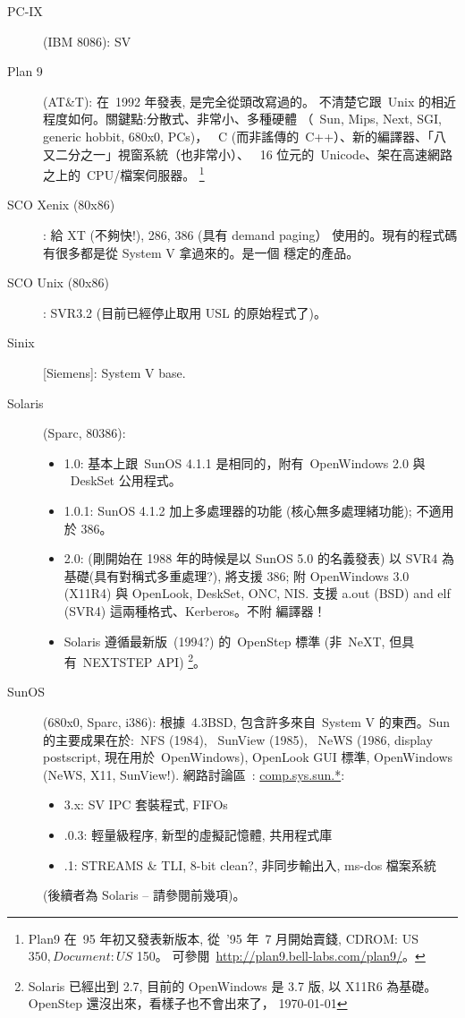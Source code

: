 \documentclass{article}
\begin{document}
\begin{CJK*}{Bg5}{ming}
\begin{description}
     \item [PC-IX] (IBM 8086):  SV

      \item [Plan 9] (AT\&T): 在~1992 年發表, 是完全從頭改寫過的。
      不清楚它跟~Unix 的相近程度如何。關鍵點:分散式、非常小、多種硬體
      （~Sun, Mips, Next, SGI, generic hobbit, 680x0, PCs)，
      ~C (而非謠傳的~C++）、新的編譯器、「八又二分之一」視窗系統（也非常小）、
      ~16 位元的~Unicode、架在高速網路之上的~CPU/檔案伺服器。
        \footnote{Plan9 在~95 年初又發表新版本, 從~'95 年~7 月開始賣錢,
                 CDROM: US$ 350, Document: US$ 150。
		 可參閱~\url{http://plan9.bell-labs.com/plan9/}。}

      \item [SCO Xenix (80x86)]: 給 XT (不夠快!), 286, 386 (具有 demand paging）
         使用的。現有的程式碼有很多都是從 System V 拿過來的。是一個
         穩定的產品。

      \item [SCO Unix (80x86)]:  SVR3.2 (目前已經停止取用 USL 的原始程式了)。

      \item [Sinix] [Siemens]: System V base.

      \item [Solaris] (Sparc, 80386):
	\begin{itemize}
         \item 1.0:  基本上跟~SunOS 4.1.1 是相同的，附有~OpenWindows 2.0 與
           ~DeskSet 公用程式。
         \item 1.0.1:  SunOS 4.1.2 加上多處理器的功能 (核心無多處理緒功能);
           不適用於 386。
         \item 2.0: (剛開始在 1988 年的時候是以 SunOS 5.0 的名義發表) 以 SVR4
           為基礎(具有對稱式多重處理?), 將支援 386; 附
           OpenWindows 3.0 (X11R4) 與 OpenLook, DeskSet, ONC, NIS.
           支援 a.out (BSD) and elf (SVR4) 這兩種格式、Kerberos。不附
           編譯器！
         \item Solaris 遵循最新版~(1994?) 的~OpenStep 標準
          (非~NeXT, 但具有~NEXTSTEP API)
          \footnote{Solaris 已經出到 2.7, 目前的 OpenWindows 是 3.7 版,
	         以 X11R6 為基礎。OpenStep 還沒出來，看樣子也不會出來了，
		\today}。
	\end{itemize}

      \item [SunOS] (680x0, Sparc, i386):  根據~4.3BSD, 包含許多來自~System V 
	的東西。Sun 的主要成果在於:~NFS (1984), ~SunView (1985), ~NeWS
         (1986, display postscript, 現在用於~OpenWindows), OpenLook GUI 標準,
         OpenWindows (NeWS, X11, SunView!).  網路討論區~: \url{comp.sys.sun.*}:
	\begin{itemize}
         \item 3.x:  SV IPC 套裝程式, FIFOs
         \item.0.3: 輕量級程序, 新型的虛擬記憶體, 共用程式庫
         \item.1: STREAMS \& TLI, 8-bit clean?, 非同步輸出入, ms-dos 檔案系統
	\end{itemize}
         (後續者為 Solaris -- 請參閱前幾項)。


\end{description}
\end{CJK*}
\end{document}
